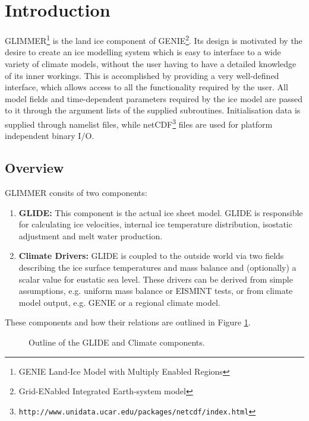 \section{Introduction}

GLIMMER\footnote{GENIE Land-Ice Model with Multiply Enabled Regions} is the land ice component of GENIE\footnote{Grid-ENabled Integrated Earth-system model}. Its design is motivated by the desire to create an ice modelling system which is easy to interface to a wide variety of climate models, without the user having to have a detailed knowledge of its inner workings. This is accomplished by providing a very well-defined interface, which allows access to all the functionality required by the user. All model fields and time-dependent parameters required by the ice model are passed to it through the argument lists of the supplied subroutines. Initialisation data is supplied through namelist files, while netCDF\footnote{\texttt{http://www.unidata.ucar.edu/packages/netcdf/index.html}} files are used for platform independent binary I/O. 

\subsection{Overview}
GLIMMER consits of two components:
\begin{enumerate}
 \item {\bf GLIDE:} This component is the actual ice sheet model. GLIDE is responsible for calculating ice velocities, internal ice temperature distribution, isostatic adjustment and melt water production.
 \item {\bf Climate Drivers:} GLIDE is coupled to the outside world via two fields describing the ice surface temperatures and mass balance and (optionally) a scalar value for eustatic sea level. These drivers can be derived from simple assumptions, e.g. uniform mass balance or EISMINT tests, or from climate model output, e.g. GENIE or a regional climate model.
\end{enumerate}
These components and how their relations are outlined in Figure \ref{ug.glide}.

\begin{figure}[htb]
 \begin{center}
 \end{center}
 \caption{Outline of the GLIDE and Climate components.}
\label{ug.glide}
\end{figure}

